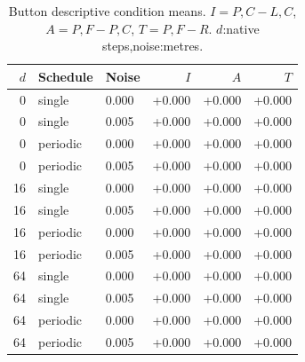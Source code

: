 \documentclass[10pt,a4paper]{article}
\begin{document}
\renewcommand{\thetable}{S\arabic{table}}
\setcounter{table}{3}
\begin{table}[H]\centering\small
\caption{Button descriptive condition means. $I=P,C-L,C$, $A=P,F-P,C$, $T=P,F-R$. $d$:native steps,noise:metres.}
\begin{tabular}{rllrrr}
\toprule $d$ & Schedule & Noise & $I$ & $A$ & $T$\\\midrule
0 & single & 0.000 & +0.000 & +0.000 & +0.000\\
0 & single & 0.005 & +0.000 & +0.000 & +0.000\\
0 & periodic & 0.000 & +0.000 & +0.000 & +0.000\\
0 & periodic & 0.005 & +0.000 & +0.000 & +0.000\\
16 & single & 0.000 & +0.000 & +0.000 & +0.000\\
16 & single & 0.005 & +0.000 & +0.000 & +0.000\\
16 & periodic & 0.000 & +0.000 & +0.000 & +0.000\\
16 & periodic & 0.005 & +0.000 & +0.000 & +0.000\\
64 & single & 0.000 & +0.000 & +0.000 & +0.000\\
64 & single & 0.005 & +0.000 & +0.000 & +0.000\\
64 & periodic & 0.000 & +0.000 & +0.000 & +0.000\\
64 & periodic & 0.005 & +0.000 & +0.000 & +0.000\\
\bottomrule\end{tabular}\end{table}
\end{document}
